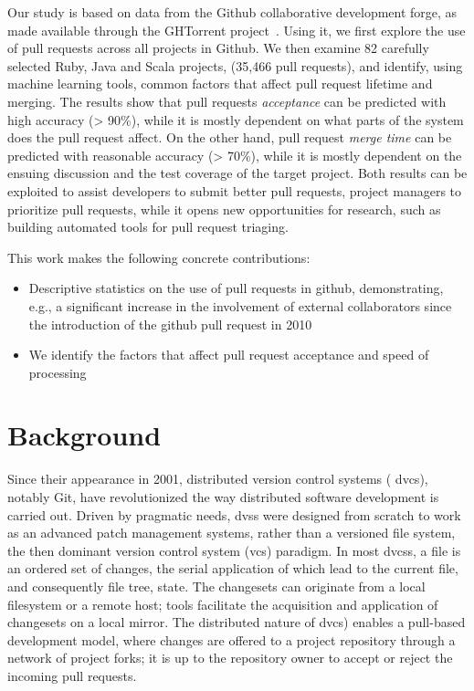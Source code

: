 \documentclass{sig-alternate}
\begin{document}
Our study is based on data from the Github collaborative development forge, as
made available through the GHTorrent project~\cite{GS12}. Using it, we first
explore the use of pull requests across all projects in Github.  We then examine
82 carefully selected Ruby, Java and Scala projects, (35,466 pull requests), and
identify, using machine learning tools, common factors that affect pull request
lifetime and merging. The results show that pull requests \emph{acceptance}
can be predicted with high accuracy (> 90\%), while it is mostly dependent on
what parts of the system does the pull request affect.  On the other hand, pull
request \emph{merge time} can be predicted with reasonable accuracy (> 70\%),
while it is mostly dependent on the ensuing discussion and the test coverage of
the target project.  Both results can be exploited to assist developers to
submit better pull requests, project managers to prioritize pull requests, while
it opens new opportunities for research, such as building automated tools for
pull request triaging.

This work makes the following concrete contributions:

\begin{itemize}

  \item Descriptive statistics on the use of pull requests in github, demonstrating, e.g., a significant increase in the involvement of external collaborators since the introduction of the github pull request in 2010 

  \item We identify the factors that affect pull request acceptance and
    speed of processing

\end{itemize}


\section{Background}

Since their appearance in 2001, distributed version control systems ({\sc
dvcs}), notably Git, have revolutionized the way distributed software
development is carried out. Driven by pragmatic needs, {\sc dvs}s were designed
from scratch to work as an advanced patch management systems, rather than a
versioned file system, the then dominant version control system ({\sc vcs})
paradigm. In most {\sc dvcs}s, a file is an ordered set of changes, the serial
application of which lead to the current file, and consequently file tree,
state. The changesets can originate from a local filesystem or a remote host;
tools facilitate the acquisition and application of changesets on a local
mirror. The distributed nature of {\sc dvcs}) enables a pull-based development
model, where changes are offered to a project repository through a network of
project forks; it is up to the repository owner to accept or reject the incoming
pull requests.
\end{document}

